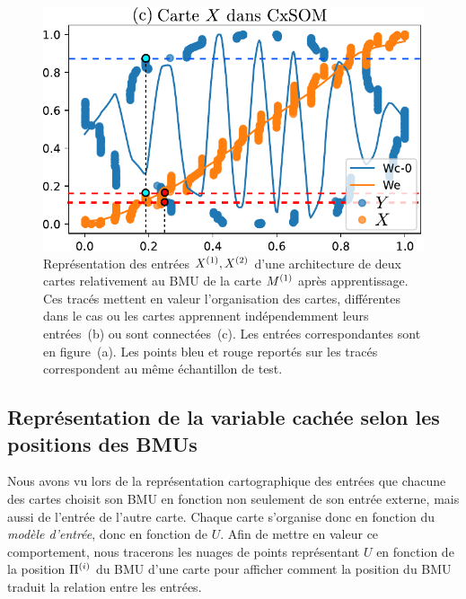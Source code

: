 \documentclass[../main]{subfiles}
\begin{document}
\begin{figure}
\begin{minipage}{0.38\textwidth}
\includegraphics[width=\textwidth]{weights_2som.pdf}
\end{minipage}

\caption{Représentation des entrées $X^{({1})},X^{({2})}$ d'une architecture de deux cartes relativement au BMU de la carte $M^{({1})}$ après apprentissage. Ces tracés mettent en valeur l'organisation des cartes, différentes dans le cas ou les cartes apprennent indépendemment leurs entrées~(b) ou sont connectées~(c). Les entrées correspondantes sont en figure~(a). Les points bleu et rouge reportés sur les tracés correspondent au même échantillon de test.\label{fig:inputs}}
\end{figure}

\subsection{Représentation de la variable cachée selon les positions des BMUs}

Nous avons vu lors de la représentation cartographique des entrées que chacune des cartes choisit son BMU  en fonction non seulement de son entrée externe, mais aussi de l'entrée de l'autre carte. Chaque carte s'organise donc en fonction du \emph{modèle d'entrée}, donc en fonction de $U$.
Afin de mettre en valeur ce comportement, nous tracerons les nuages de points représentant $U$ en fonction de la position $\Pi^{({i})}$ du BMU d'une carte pour afficher comment la position du BMU traduit la relation entre les entrées.
\end{document}
